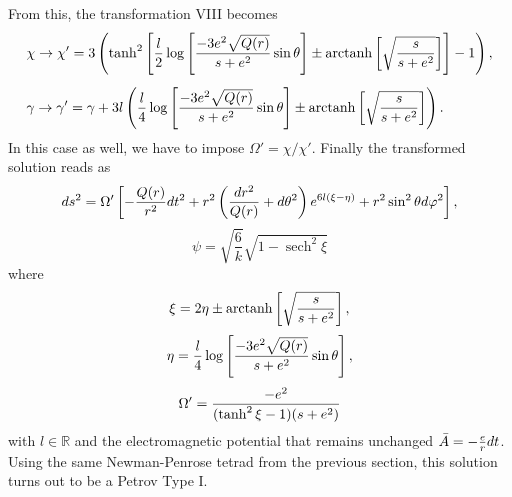 From this, the transformation VIII becomes
\begin{align}
        &\chi \rightarrow \chi' = 3\left(\tanh^2\left[\frac{l}{2}\log\left[\frac{-3 e^2\sqrt{Q(r)}}{s+e^2}\sin\theta\right] \pm \operatorname{arctanh} \left[ \sqrt{\frac{s}{s+e^2}}\right]\right] - 1\right), \notag\\[0.5em]
        &\gamma \rightarrow \gamma' = \gamma + 3l\left(\frac{l}{4}\log\left[\frac{-3 e^2\sqrt{Q(r)}}{s+e^2}\sin\theta\right] \pm \operatorname{arctanh} \left[ \sqrt{\frac{s}{s+e^2}}\right] \right).\notag
\end{align}
In this case as well, we have to impose $\Omega' = \chi/\chi'$. Finally the transformed solution reads as 
\begin{equation}
    ds^2=\Omega'\left[-\frac{Q(r)}{r^2}dt^2+r^2\left(\frac{dr^2}{Q(r)} + d\theta^2 \right) e^{6l(\xi-\eta)}+r^2\sin^2\theta d\varphi^2\right],
    \notag
\end{equation}
\begin{equation}
    \psi=\sqrt{\frac{6}{k}}\sqrt{1-\operatorname{sech}^2\xi} 
    \label{R.N. PELOSO +VIII)}
\end{equation}
where
\begin{equation}
    \xi = 2\eta \pm \operatorname{arctanh} \left[ \sqrt{\frac{s}{s+e^2}}\right], \notag
\end{equation}
\begin{equation}
    \eta = \frac{l}{4}\log\left[\frac{-3 e^2\sqrt{Q(r)}}{s+e^2}\sin\theta\right], \notag
\end{equation}
\begin{equation}
    \Omega' = \frac{-e^2}{( \tanh^2\xi-1)(s+e^2)} \notag
\end{equation}
with $l \in \mathbb{R}$ and the electromagnetic potential that remains unchanged $\Bar{A} = -\frac{e}{r} dt$. Using the same Newman-Penrose tetrad from the previous section, this solution turns out to be a Petrov Type I.

